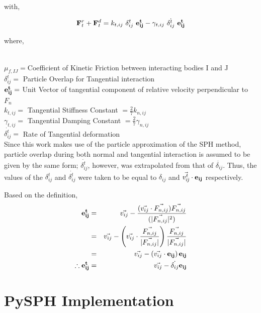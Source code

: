 \hspace{3.15cm}with,

\begin{eqnarray}
 {\bf{F}}_t^r + {\bf{F}}_t^d = k_{t,ij}~\delta^t_{ij}~{\bf{e^t_{ij}}} - \gamma _{t,ij} ~ \dot{\delta ^t_{ij}}~\bf{e^t_{ij}}
\end{eqnarray}

{\raggedright{where,}}\\
$\mu_{f,IJ} = $Coefficient of Kinetic Friction between interacting bodies I and J\\
$\delta^t_{ij} = $ Particle Overlap for Tangential interaction \\
${\bf{e^t_{ij}}} = $ Unit Vector of tangential component of relative velocity perpendicular to $F_n$\cite{vetsch}\\
$k_{t,ij} = $ Tangential Stiffness Constant $= \frac{2}{7} k_{n,ij}$ \cite{hooman}\\
$\gamma_{t,ij} = $ Tangential Damping Constant $=\frac{2}{7} \gamma_{n,ij}$\cite{canelas_thesis}\\
$\dot{\delta ^t_{ij}} = $ Rate of Tangential deformation \\

Since this work makes use of the particle approximation of the SPH method, particle overlap during both normal and tangential interaction is assumed to be given by the same form; $\dot{\delta ^t_{ij}}$, however, was extrapolated from that of $\dot{\delta _{ij}}$. Thus, the values of the  $\delta^t_{ij}$ and $\dot{\delta ^t_{ij}}$ were taken to be equal to $\delta_{ij}$ and $ \vec{\it{v^t_{ij}}}\cdot {\bf{e_{ij}}}$ respectively. 

Based on the definition, 
\begin{eqnarray}
 {\bf{e^t_{ij}}}            &=& \vec{v_{ij}} - \frac{(\vec{v_{ij}} \cdot \vec{F_{n,ij}}) \vec{F_{n,ij}}}{(|\vec{F_{n,ij}}|^2)} \nonumber\\
                            &=& \vec{v_{ij}} - \left(\vec{v_{ij}}\cdot\frac{\vec{F_{n,ij}}}{|\vec{F_{n,ij}}|}\right)\frac{\vec{F_{n,ij}}}{|\vec{F_{n,ij}}|} \nonumber\\
                            &=& \vec{v_{ij}} - \left(\vec{v_{ij}}\cdot{\bf{e_{ij}}}\right){\bf{e_{ij}}}\nonumber\\
 \therefore {\bf{e^t_{ij}}} &=& \vec{v_{ij}} - \dot{\delta_{ij}}{\bf{e_{ij}}}\nonumber
\end{eqnarray}


\section{PySPH Implementation}

